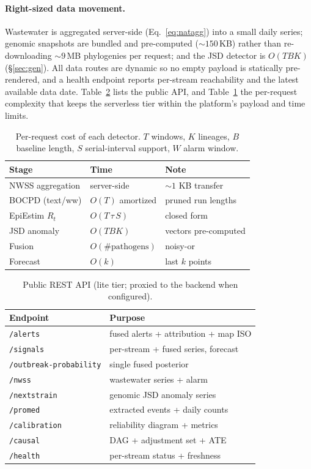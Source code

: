\documentclass[10pt,twocolumn]{article}
\theoremstyle{definition}
\newcommand{\Rt}{R_t}
\newcommand{\code}[1]{\texttt{\small #1}}
\begin{document}
\paragraph{Right-sized data movement.}
Wastewater is aggregated server-side (Eq.~\ref{eq:natagg}) into a small daily
series; genomic snapshots are bundled and pre-computed ($\sim$$150$\,KB) rather
than re-downloading $\sim$$9$\,MB phylogenies per request; and the JSD detector is
$O(TBK)$ (\S\ref{sec:gen}). All data routes are dynamic so no empty payload is
statically pre-rendered, and a health endpoint reports per-stream reachability
and the latest available data date. Table~\ref{tab:api} lists the public API, and
Table~\ref{tab:complexity} the per-request complexity that keeps the serverless
tier within the platform's payload and time limits.

\begin{table}[t]
\centering\footnotesize
\caption{Per-request cost of each detector. $T$ windows, $K$ lineages, $B$
baseline length, $S$ serial-interval support, $W$ alarm window.}
\label{tab:complexity}
\begin{tabular}{lll}
\toprule
Stage & Time & Note \\
\midrule
NWSS aggregation & server-side & $\sim$$1$ KB transfer \\
BOCPD (text/ww) & $O(T)$ amortized & pruned run lengths \\
EpiEstim $\Rt$ & $O(T\,\tau\,S)$ & closed form \\
JSD anomaly & $O(T B K)$ & vectors pre-computed \\
Fusion & $O(\#\text{pathogens})$ & noisy-or \\
Forecast & $O(k)$ & last $k$ points \\
\bottomrule
\end{tabular}
\end{table}

\begin{table}[t]
\centering\footnotesize
\caption{Public REST API (lite tier; proxied to the backend when configured).}
\label{tab:api}
\begin{tabular}{ll}
\toprule
Endpoint & Purpose \\
\midrule
\code{/alerts} & fused alerts + attribution + map ISO \\
\code{/signals} & per-stream + fused series, forecast \\
\code{/outbreak-probability} & single fused posterior \\
\code{/nwss} & wastewater series + alarm \\
\code{/nextstrain} & genomic JSD anomaly series \\
\code{/promed} & extracted events + daily counts \\
\code{/calibration} & reliability diagram + metrics \\
\code{/causal} & DAG + adjustment set + ATE \\
\code{/health} & per-stream status + freshness \\
\bottomrule
\end{tabular}
\end{table}
\end{document}
